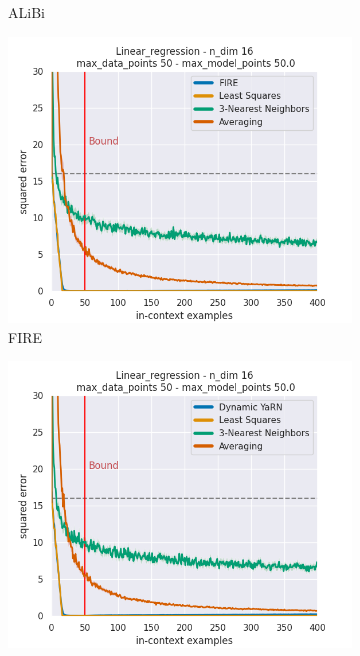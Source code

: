 \documentclass[letterpaper]{article} %
\begin{document}
\begin{figure}[tp]
\begin{subfigure}[t]{0.24\linewidth}
        \caption{ALiBi}
    \end{subfigure}
    \begin{subfigure}[t]{0.24\linewidth}
        \includegraphics[width=\linewidth]{AnonymousSubmission/LaTeX/imgs/experiments/linear-regression/fire.png}
        \caption{FIRE}
    \end{subfigure}
    \begin{subfigure}[t]{0.24\linewidth}
        \includegraphics[width=\linewidth]{AnonymousSubmission/LaTeX/imgs/experiments/linear-regression/dynamic-yarn.png}

\end{subfigure}
\end{figure}
\end{document}
